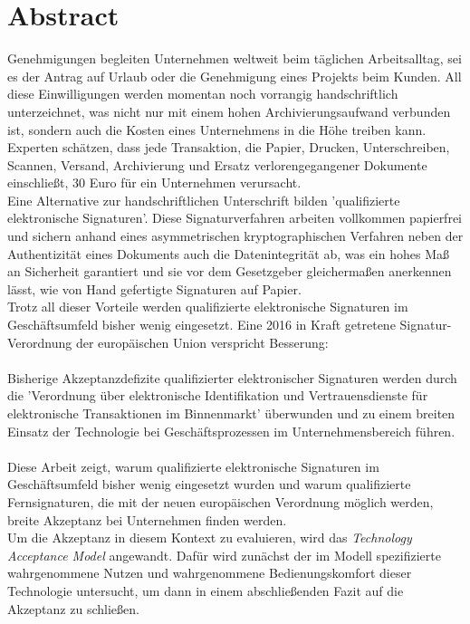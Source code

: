 \documentclass[deutsch]{lib/llncs/llncs}
\begin{document}
\section{Abstract}
Genehmigungen begleiten Unternehmen weltweit beim täglichen Arbeitsalltag, sei es der Antrag auf Urlaub oder die Genehmigung eines Projekts beim Kunden. All diese Einwilligungen werden momentan noch vorrangig handschriftlich unterzeichnet, was nicht nur mit einem hohen Archivierungsaufwand verbunden ist, sondern auch die Kosten eines Unternehmens in die Höhe treiben kann. Experten schätzen, dass jede Transaktion, die Papier, Drucken, Unterschreiben, Scannen, Versand, Archivierung und Ersatz verlorengegangener Dokumente einschließt, 30 Euro für ein Unternehmen verursacht. \\
Eine Alternative zur handschriftlichen Unterschrift bilden 'qualifizierte elektronische Signaturen'. Diese Signaturverfahren arbeiten vollkommen papierfrei und sichern anhand eines asymmetrischen kryptographischen Verfahren neben der Authentizität eines Dokuments auch die Datenintegrität ab, was ein hohes Maß an Sicherheit garantiert und sie vor dem Gesetzgeber gleichermaßen anerkennen lässt, wie von Hand gefertigte Signaturen auf Papier. \\
Trotz all dieser Vorteile werden qualifizierte elektronische Signaturen im Geschäftsumfeld bisher wenig eingesetzt. Eine 2016 in Kraft getretene Signatur-Verordnung der europäischen Union verspricht Besserung: \\\\
Bisherige Akzeptanzdefizite qualifizierter elektronischer Signaturen werden durch die 'Verordnung über elektronische Identifikation und Vertrauensdienste für elektronische Transaktionen im Binnenmarkt' überwunden und zu einem breiten Einsatz der Technologie bei Geschäftsprozessen im Unternehmensbereich führen. \\\\
Diese Arbeit zeigt, warum qualifizierte elektronische Signaturen im Geschäftsumfeld bisher wenig eingesetzt wurden und warum qualifizierte Fernsignaturen, die mit der neuen europäischen Verordnung möglich werden, breite Akzeptanz bei Unternehmen finden werden. \\
Um die Akzeptanz in diesem Kontext zu evaluieren, wird das \textit{Technology Acceptance Model} angewandt.
Dafür wird zunächst der im Modell spezifizierte wahrgenommene Nutzen und wahrgenommene Bedienungskomfort dieser Technologie untersucht, um dann in einem abschließenden Fazit auf die Akzeptanz zu schließen. 
\end{document}
